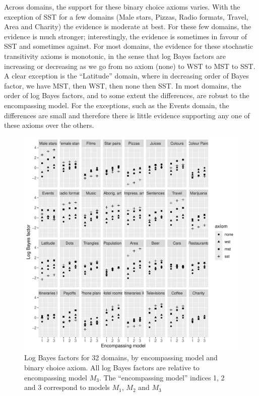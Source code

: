 \documentclass[11pt,letter]{article}
\begin{document}
Across domains, the support for these binary choice axioms varies.
With the exception of SST for a few domains (Male stars, Pizzas, Radio formats, Travel, Area and Charity) the evidence is moderate at best.
For these few domains, the evidence is much stronger; interestingly, the evidence is sometimes in favour of SST and sometimes against.
For most domains, the evidence for these stochastic transitivity axioms is monotonic, in the sense that log Bayes factors are increasing or decreasing as we go from no axiom (none) to WST to MST to SST.
A clear exception is the ``Latitude'' domain, where in decreasing order of Bayes factor, we have MST, then WST, then none then SST.
In most domains, the order of log Bayes factors, and to some extent the differences, are robust to the encompassing model.
For the exceptions, such as the Events domain, the differences are small and therefore there is little evidence supporting any one of these axioms over the others.

\begin{figure}
	\begin{center}
	\includegraphics[width=16cm]{Figures/binary_BF}
	\caption{Log Bayes factors for 32 domains, by encompassing model and binary choice axiom. All log Bayes factors are relative to encompassing model $M_3$. The ``encompassing model'' indices 1, 2 and 3 correspond to models $M_1$, $M_2$ and $M_3$}\label{f:binary_BF}
	\end{center}
\end{figure}
\end{document}
